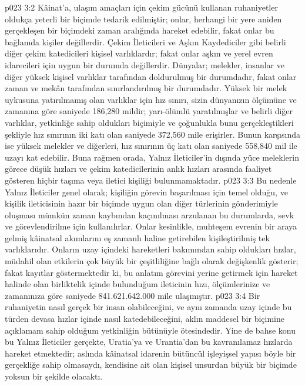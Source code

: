\vs p023 3:2 Kâinat’a, ulaşım amaçları için çekim gücünü kullanan ruhaniyetler oldukça yeterli bir biçimde tedarik edilmiştir; onlar, herhangi bir yere aniden gerçekleşen bir biçimdeki zaman aralığında hareket edebilir, fakat onlar bu bağlamda kişiler değillerdir. Çekim İleticileri ve Aşkın Kaydediciler gibi belirli diğer çekim katedicileri kişisel varlıklardır; fakat onlar aşkın ve yerel evren idarecileri için uygun bir durumda değillerdir. Dünyalar; melekler, insanlar ve diğer yüksek kişisel varlıklar tarafından doldurulmuş bir durumdadır, fakat onlar zaman ve mekân tarafından sınırlandırılmış bir durumdadır. Yüksek bir melek uykusuna yatırılmamış olan varlıklar için hız sınırı, sizin dünyanızın ölçümüne ve zamanına göre saniyede 186,280 mildir; yarı\hyp{}ölümlü yaratılmışlar ve belirli diğer varlıklar, yetkinliğe sahip oldukları biçimiyle ve çoğunlukla bunu gerçekleştikleri şekliyle hız sınırının iki katı olan saniyede 372,560 mile erişirler. Bunun karşısında ise yüksek melekler ve diğerleri, hız sınırının üç katı olan saniyede 558,840 mil ile uzayı kat edebilir. Buna rağmen orada, Yalnız İleticiler’in dışında yüce meleklerin görece düşük hızları ve çekim katedicilerinin anlık hızları arasında faaliyet gösteren hiçbir taşıma veya iletici kişiliği bulunmamaktadır.
\vs p023 3:3 Bu nedenle Yalnız İleticiler genel olarak; kişiliğin görevin başarılması için temel olduğu, ve kişilik ileticisinin hazır bir biçimde uygun olan diğer türlerinin gönderimiyle oluşması mümkün zaman kaybından kaçınılması arzulanan bu durumlarda, sevk ve görevlendirilme için kullanılırlar. Onlar kesinlikle, muhteşem evrenin bir araya gelmiş kâinatsal akımlarını eş zamanlı haline getirebilen kişileştirilmiş tek varlıklarıdır. Onların uzay içindeki hareketleri bakımından sahip oldukları hızlar, müdahil olan etkilerin çok büyük bir çeşitliliğine bağlı olarak değişkenlik gösterir; fakat kayıtlar göstermektedir ki, bu anlatım görevini yerine getirmek için hareket halinde olan birliktelik içinde bulunduğum ileticinin hızı, ölçümlerinize ve zamanınıza göre saniyede 841.621.642.000 mile ulaşmıştır.
\vs p023 3:4 Bir ruhaniyetin nasıl gerçek bir insan olabileceğini, ve aynı zamanda uzay içinde bu türden devasa hızlar içinde nasıl katedebileceğini, aklın maddesel bir biçimine açıklamam sahip olduğum yetkinliğin bütünüyle ötesindedir. Yine de bahse konu bu Yalnız İleticiler gerçekte, Uratia’ya ve Urantia’dan bu kavranılamaz hızlarda hareket etmektedir; aslında kâinatsal idarenin bütüncül işleyişsel yapısı böyle bir gerçekliğe sahip olmasaydı, kendisine ait olan kişisel unsurdan büyük bir biçimde yoksun bir şekilde olacaktı.
